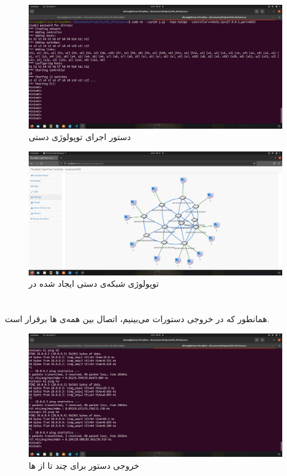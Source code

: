 \documentclass{article}
\begin{document}
\section{}
\begin{figure}[H]
    \centering
    \includegraphics[width=1.0\textwidth]{figures/2b.jpg}
    \caption
	{
دستور اجرای توپولوژی دستی
	}
    \label{fig:fig1}
\end{figure}
\begin{figure}[H]
    \centering
    \includegraphics[width=1.0\textwidth]{figures/2a.jpg}
    \caption
	{
توپولوژی شبکه‌ی دستی ایجاد شده در 
	}
    \label{fig:fig1}
\end{figure}

\section{}
همانطور که در خروجی دستورات  می‌بینیم، اتصال بین همه‌ی ‌ها برقرار است.
\begin{figure}[H]
    \centering
    \includegraphics[width=1.0\textwidth]{figures/3.jpg}
    \caption
	{
خروجی دستور  برای چند تا از ‌ها
	}
    \label{fig:fig1}
\end{figure}
\end{document}
